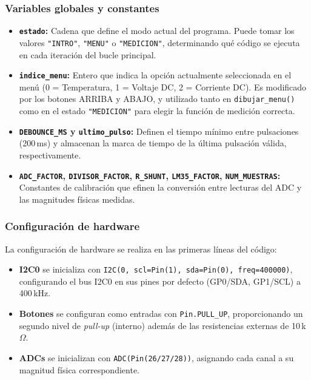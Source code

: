 \documentclass[letterpaper,12pt]{article}
\begin{document}
    \subsubsection{Variables globales y constantes}

    \begin{itemize}
        \item \textbf{\texttt{estado}:} Cadena que define el modo actual del programa. Puede tomar los valores \texttt{"INTRO"}, \texttt{"MENU"} o \texttt{"MEDICION"}, determinando qué código se ejecuta en cada iteración del bucle principal.
        \item \textbf{\texttt{indice\_menu}:} Entero que indica la opción actualmente seleccionada en el menú (0 = Temperatura, 1 = Voltaje DC, 2 = Corriente DC). Es modificado por los botones ARRIBA y ABAJO, y utilizado tanto en \texttt{dibujar\_menu()} como en el estado \texttt{"MEDICION"} para elegir la función de medición correcta.
        \item \textbf{\texttt{DEBOUNCE\_MS} y \texttt{ultimo\_pulso}:} Definen el tiempo mínimo entre pulsaciones (200\,ms) y almacenan la marca de tiempo de la última pulsación válida, respectivamente. 
        \item \textbf{\texttt{ADC\_FACTOR}, \texttt{DIVISOR\_FACTOR}, \texttt{R\_SHUNT}, \texttt{LM35\_FACTOR}, \texttt{NUM\_MUESTRAS}:} Constantes de calibración que efinen la conversión entre lecturas del ADC y las magnitudes físicas medidas.
    \end{itemize}

    \subsubsection{Configuración de hardware}

    La configuración de hardware se realiza en las primeras líneas del código:

    \begin{itemize}
        \item \textbf{I2C0} se inicializa con \texttt{I2C(0, scl=Pin(1), sda=Pin(0), freq=400000)}, configurando el bus I2C0 en sus pines por defecto (GP0/SDA, GP1/SCL) a 400\,kHz.
        \item \textbf{Botones} se configuran como entradas con \texttt{Pin.PULL\_UP}, proporcionando un segundo nivel de \textit{pull-up} (interno) además de las resistencias externas de 10\,k$\Omega$.
        \item \textbf{ADCs} se inicializan con \texttt{ADC(Pin(26/27/28))}, asignando cada canal a su magnitud física correspondiente.
    \end{itemize}
\end{document}
